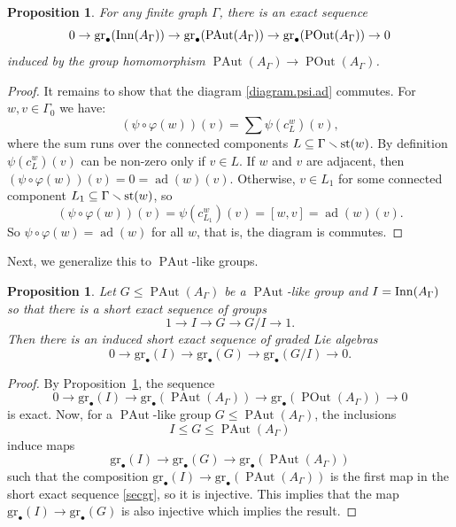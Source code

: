 \documentclass[10pt]{amsart}
\newtheorem{prop}[theorem]{Proposition}
\theoremstyle{definition}
\newcommand{\Inn}{{\rm Inn}}
\newcommand{\st}{{\rm st}}
\newcommand{\PAut}{\operatorname{PAut}}
\newcommand{\POut}{\operatorname {POut}}
\newcommand{\gr}{\mathrm{gr}_\bullet}
\newcommand{\ad}{\operatorname{ad}}
\theoremstyle{definition}
\numberwithin{equation}{section}
\begin{document}
\begin{prop}  \label{grInnPAut}
For any finite graph $\Gamma$, there is an exact sequence
\[ 0\to \gr(\Inn(A_\Gamma))\to\gr(\PAut(A_\Gamma))\to\gr(\POut(A_{\Gamma}))\to 0\]
induced by the group homomorphism $\PAut(A_\Gamma) \to \POut(A_\Gamma)$.
\end{prop}

\begin{proof}
It remains to show that the diagram \eqref{diagram.psi.ad} commutes. For $w, v \in \Gamma_0$ we have:
\[ (\psi \circ \varphi (w))(v) = \sum \psi( c_L^w ) (v),\]
where the sum runs over the connected components $L \subseteq \Gamma \smallsetminus \st(w)$. By definition $\psi( c_L^w ) (v)$ can be non-zero
only if $v \in L$. If $w$ and $v$ are adjacent, then $(\psi \circ \varphi (w))(v) = 0 = \ad(w)(v)$. Otherwise, $v \in L_1$ for some
connected component $L_1 \subseteq \Gamma \smallsetminus \st(w)$, so
\[ (\psi \circ \varphi (w))(v) = \psi(c_{L_1}^w) (v) = [w,v] = \ad(w)(v).\]
So $\psi \circ \varphi(w) = \ad(w)$ for all $w$, that is, the diagram is commutes.
 \end{proof}

 Next, we generalize this to $\PAut$-like groups.

\begin{prop}\label{prop:centralextension}
Let $G\leq \PAut(A_{\Gamma})$ be a $\PAut$-like group and $I=\Inn(A_\Gamma)$ so that there is a short exact sequence of groups
\[1\to I\to G\to G/I\to 1.\]
Then there is an induced short exact sequence of graded Lie algebras
\[0\to\gr(I)\to\gr(G)\to\gr(G/I)\to 0.\]
\end{prop}
\begin{proof}  By Proposition~\ref{grInnPAut}, the sequence
\begin{equation}  \label{secgr} 0\to\gr(I)\to\gr(\PAut(A_\Gamma))\to\gr(\POut(A_\Gamma))\to 0 \end{equation}
is exact. Now, for a $\PAut$-like group $G \leq \PAut(A_\Gamma)$, the inclusions
\[I\leq G\leq\PAut(A_\Gamma)\]
induce maps
\[\gr(I)\to\gr(G)\to\gr(\PAut(A_\Gamma))\]
such that the composition  $\gr(I)\to\gr(\PAut(A_\Gamma))$ is the first map in the short exact sequence \eqref{secgr},
so it is injective. This implies that the map $\gr(I)\to\gr(G)$ is also injective which implies the result.
\end{proof}
\end{document}
